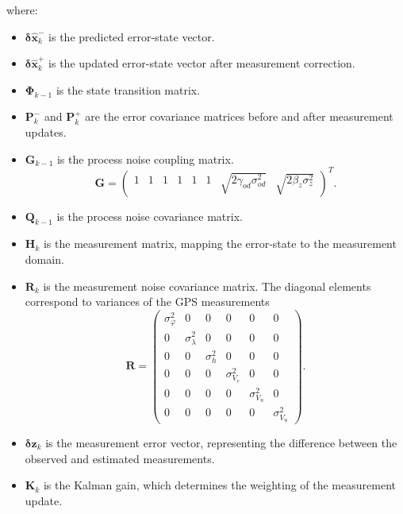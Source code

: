 \documentclass[conference]{IEEEtran}
\begin{document}
where:
\begin{itemize}
\item $\boldsymbol{\delta \hat{x}}_k^{-}$ is the predicted error-state vector.
\item $\boldsymbol{\delta \hat{x}}_k^{+}$ is the updated error-state vector after measurement correction.
\item $\mathbf{\Phi}_{k-1}$ is the state transition matrix.
\item $\mathbf{P}_k^{-}$ and $\mathbf{P}_k^{+}$ are the error covariance matrices before and after measurement updates.
\item $\mathbf{G}_{k-1}$ is the process noise coupling matrix.
\begin{equation}
    \mathbf{G} =
    \begin{pmatrix}
        1 & 1 & 1 & 1 & 1 & 1 & \sqrt{2\gamma_{od} \sigma_{od}^2} & \sqrt{2\beta_z \sigma_z^2}
    \end{pmatrix}^{T}.
\end{equation}

\item $\mathbf{Q}_{k-1}$ is the process noise covariance matrix.
\item $\mathbf{H}_k$ is the measurement matrix, mapping the error-state to the measurement domain.
\item $\mathbf{R}_k$ is the measurement noise covariance matrix. The diagonal elements correspond to variances of the GPS
measurements
\begin{equation}
    \mathbf{R} =
    \begin{pmatrix}
        \sigma^2_{\varphi} & 0 & 0 & 0 & 0 & 0 \\
        0 & \sigma^2_{\lambda} & 0 & 0 & 0 & 0 \\
        0 & 0 & \sigma^2_{h} & 0 & 0 & 0 \\
        0 & 0 & 0 & \sigma^2_{V_e} & 0 & 0 \\
        0 & 0 & 0 & 0 & \sigma^2_{V_n} & 0 \\
        0 & 0 & 0 & 0 & 0 & \sigma^2_{V_u}
    \end{pmatrix}.
\end{equation}

\item $\boldsymbol{\delta z}_k$ is the measurement error vector, representing the difference between the observed and estimated measurements.
\item $\mathbf{K}_k$ is the Kalman gain, which determines the weighting of the measurement update.
\end{itemize}
\end{document}
